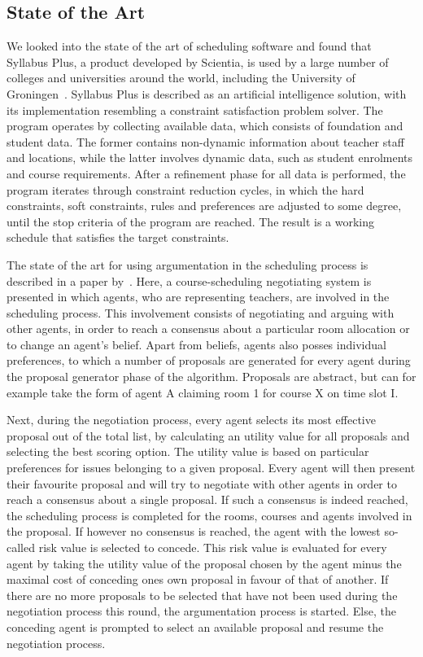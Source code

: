 \subsection{State of the Art}
We looked into the state of the art of scheduling software and found that 
Syllabus Plus, a product developed by Scientia, is used by a large number 
of colleges and universities around the world, including the University of 
Groningen~\cite{SyllabusPlus}. Syllabus Plus is described as an artificial 
intelligence solution, with its implementation resembling a constraint 
satisfaction problem solver. The program operates by collecting available 
data, which consists of foundation and student data. The former contains 
non-dynamic information about teacher staff and locations, while the latter 
involves dynamic data, such as student enrolments and course requirements. 
After a refinement phase for all data is performed, the program iterates 
through constraint reduction cycles, in which the hard constraints, soft 
constraints, rules and preferences are adjusted to some degree, until the 
stop criteria of the program are reached. The result is a working schedule 
that satisfies the target constraints.

The state of the art for using argumentation in the scheduling process is 
described in a paper by~\cite{Kuo:jc}. Here, a course-scheduling 
negotiating system is presented in which agents, who are representing 
teachers, are involved in the scheduling process. This involvement consists 
of negotiating and arguing with other agents, in order to reach a consensus 
about a particular room allocation or to change an agent's belief. Apart 
from beliefs, agents also posses individual preferences, to which a number 
of proposals are generated for every agent during the proposal generator 
phase of the algorithm. Proposals are abstract, but can for example take 
the form of agent A claiming room 1 for course X on time slot I. 

Next, during the negotiation process, every agent selects its most 
effective proposal out of the total list, by calculating an utility value 
for all proposals and selecting the best scoring option. The utility value 
is based on particular preferences for issues belonging to a given 
proposal. Every agent will then present their favourite proposal and will 
try to negotiate with other agents in order to reach a consensus about a 
single proposal. If such a consensus is indeed reached, the scheduling 
process is completed for the rooms, courses and agents involved in the 
proposal. If however no consensus is reached, the agent with the lowest 
so-called risk value is selected to concede. This risk value is evaluated for 
every agent by taking the utility value of the proposal chosen by the agent 
minus the maximal cost of conceding ones own proposal in favour of that of 
another. If there are no more proposals to be selected that have not been 
used during the negotiation process this round, the argumentation process 
is started. Else, the conceding agent is prompted to select an available 
proposal and resume the negotiation process. 

